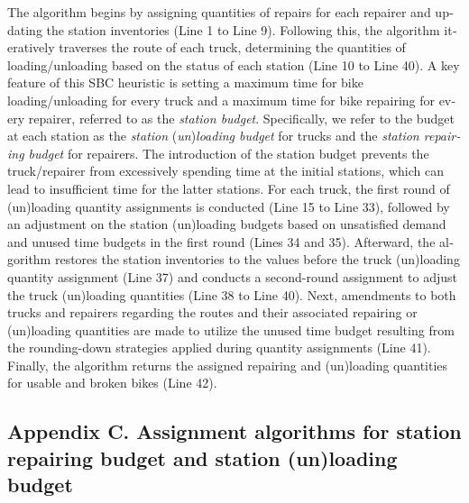 \documentclass[
  english,
]{article}
\begin{document}
\begin{otherlanguage}{english}
The algorithm begins by assigning quantities of repairs for each repairer and updating the station
inventories (Line 1 to Line 9). Following this, the algorithm iteratively traverses the route of
each truck, determining the quantities of loading/unloading based on the status of each station
(Line 10 to Line 40). A key feature of this SBC heuristic is setting a maximum time for bike
loading/unloading for every truck and a maximum time for bike repairing for every repairer, referred
to as the \emph{station budget}. Specifically, we refer to the budget at each station as the
\emph{station} (\emph{un})\emph{loading budget} for trucks and the \emph{station repairing budget}
for repairers. The introduction of the station budget prevents the truck/repairer from excessively
spending time at the initial stations, which can lead to insufficient time for the latter stations.
For each truck, the first round of (un)loading quantity assignments is conducted (Line 15 to Line
33), followed by an adjustment on the station (un)loading budgets based on unsatisfied demand and
unused time budgets in the first round (Lines 34 and 35). Afterward, the algorithm restores the
station inventories to the values before the truck (un)loading quantity assignment (Line 37) and
conducts a second-round assignment to adjust the truck (un)loading quantities (Line 38 to Line 40).
Next, amendments to both trucks and repairers regarding the routes and their associated repairing or
(un)loading quantities are made to utilize the unused time budget resulting from the rounding-down
strategies applied during quantity assignments (Line 41). Finally, the algorithm returns the
assigned repairing and (un)loading quantities for usable and broken bikes (Line 42).

\protect{}\label{s0155}
\subsection{Appendix C. Assignment algorithms for station repairing budget and station (un)loading
budget}\label{st185}


\end{otherlanguage}
\end{document}
